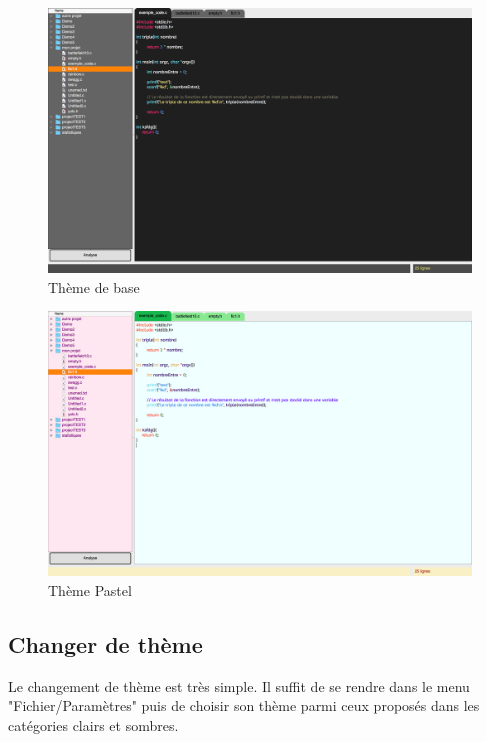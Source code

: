 \documentclass[a4paper,12pt]{article}
\begin{document}
		\begin{figure}[h!]
			\begin{center}
				\includegraphics[scale=0.2]{images/imgs_themes/theme_basic}
				\caption{Thème de base}
			\end{center}
		\end{figure}
		
		\begin{figure}[h!]
			\begin{center}
				\includegraphics[scale=0.2]{images/imgs_themes/theme_pastel}
				\caption{Thème Pastel}
			\end{center}
		\end{figure}
		
		\newpage
		\subsection{Changer de thème}
		
			Le changement de thème est très simple. Il suffit de se rendre dans le menu "Fichier/Paramètres" puis de choisir son thème parmi ceux proposés dans les catégories clairs et sombres.
	
\end{document}
